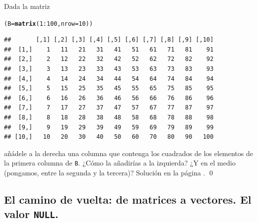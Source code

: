 \documentclass[10pt,a4paper]{article}\usepackage[]{graphicx}\usepackage[]{color}
\makeatletter
\newcommand{\hlnum}[1]{\textcolor[rgb]{0.686,0.059,0.569}{#1}}%
\newcommand{\hlopt}[1]{\textcolor[rgb]{0,0,0}{#1}}%
\newcommand{\hlstd}[1]{\textcolor[rgb]{0.345,0.345,0.345}{#1}}%
\newcommand{\hlkwb}[1]{\textcolor[rgb]{0.69,0.353,0.396}{#1}}%
\newcommand{\hlkwc}[1]{\textcolor[rgb]{0.333,0.667,0.333}{#1}}%
\newcommand{\hlkwd}[1]{\textcolor[rgb]{0.737,0.353,0.396}{\textbf{#1}}}%
\newenvironment{kframe}{%
 \def\at@end@of@kframe{}%
 \ifinner\ifhmode%
  \def\at@end@of@kframe{\end{minipage}}%
  \begin{minipage}{\columnwidth}%
 \fi\fi%
 \def\FrameCommand##1{\hskip\@totalleftmargin \hskip-\fboxsep
 \colorbox{shadecolor}{##1}\hskip-\fboxsep
     \hskip-\linewidth \hskip-\@totalleftmargin \hskip\columnwidth}%
 \MakeFramed {\advance\hsize-\width
   \@totalleftmargin\z@ \linewidth\hsize
   \@setminipage}}%
 {\par\unskip\endMakeFramed%
 \at@end@of@kframe}
\newenvironment{knitrout}{}{} %
\newcounter {cont01}
\makeatother
\begin{document}
\begin{ejercicio}
\label{tut03:ejercicio09}
\quad
Dada la matriz
\begin{knitrout}
\color{fgcolor}\begin{kframe}
\begin{alltt}
    \hlstd{(B} \hlkwb{=} \hlkwd{matrix}\hlstd{(}\hlnum{1}\hlopt{:}\hlnum{100}\hlstd{,} \hlkwc{nrow}\hlstd{=}\hlnum{10}\hlstd{))}
\end{alltt}
\begin{verbatim}
##       [,1] [,2] [,3] [,4] [,5] [,6] [,7] [,8] [,9] [,10]
##  [1,]    1   11   21   31   41   51   61   71   81    91
##  [2,]    2   12   22   32   42   52   62   72   82    92
##  [3,]    3   13   23   33   43   53   63   73   83    93
##  [4,]    4   14   24   34   44   54   64   74   84    94
##  [5,]    5   15   25   35   45   55   65   75   85    95
##  [6,]    6   16   26   36   46   56   66   76   86    96
##  [7,]    7   17   27   37   47   57   67   77   87    97
##  [8,]    8   18   28   38   48   58   68   78   88    98
##  [9,]    9   19   29   39   49   59   69   79   89    99
## [10,]   10   20   30   40   50   60   70   80   90   100
\end{verbatim}
\end{kframe}
\end{knitrout}
añádele a la derecha una columna que contenga los cuadrados de los elementos de la primera columna de {\tt B}. ¿Cómo la añadirías a la izquierda? ¿Y en el medio (pongamos, entre la segunda y la tercera)? Solución en la página \pageref{tut03:ejercicio09:sol}.
\qed
\end{ejercicio}

\subsection{El camino de vuelta: de matrices a vectores. El valor {\tt NULL}.}
\label{tut03:subsec:CaminoVueltaMatricesVectores}
\end{document}
